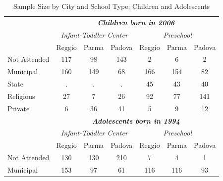 \documentclass[12pt]{article}
\begin{document}
\begin{table}[ht]
\caption{Sample Size by City and School Type; Children and Adolescents}
\label{tab:sample-adol}

\begin{center}
\begin{tabular}{l ccc|ccc}
\hline\hline
 & \multicolumn{6}{c}{\textit{\textbf{Children born in 2006}}} \\ 
 & \multicolumn{3}{c}{\textit{Infant-Toddler Center}} & \multicolumn{3}{c}{\textit{Preschool}} \\ 
 & Reggio & Parma & Padova & Reggio & Parma & Padova \\ \hline
Not Attended    & 117 &  98 & 143 &   2 &   6 &   2 \\ 
Municipal       & 160 & 149 &  68 & 166 & 154 &  82 \\ 
State           &   . &   . &   . &  45 &  43 &  40 \\ 
Religious       &  27 &   7 &  26 &  92 &  77 & 141 \\ 
Private         &   6 &  36 &  41 &   5 &   9 &  12 \\ \hline 
%
%
\rule{0pt}{1.2\normalbaselineskip}
 & \multicolumn{6}{c}{\textit{\textbf{Adolescents born in 1994}}} \\ 

 & \multicolumn{3}{c}{\textit{Infant-Toddler Center}} & \multicolumn{3}{c}{\textit{Preschool}} \\ 

 & Reggio & Parma & Padova & Reggio & Parma & Padova \\ \hline
Not Attended    & 130 & 130 & 210 &   7 &   4 &   1 \\ 
Municipal       & 153 &  97 &  61 & 116 & 116 &  93 \\ 




\end{tabular}
\end{center}
\end{table}
\end{document}
